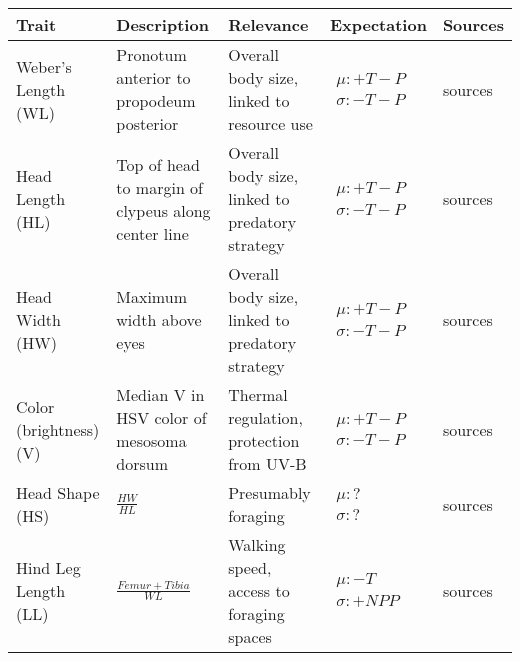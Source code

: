 \documentclass[review,preprint,3p]{elsarticle}
\begin{document}
	\begin{table}[t]
		\small
		\centering
		\begin{tabular}{m{} | >{\raggedright}m{} | m{} | >{\raggedright}m{} | m{}}
			\hline
			\centering Trait & \centering Description & \centering Relevance & Expectation & Sources \\ 
			\hline
			Weber's Length (WL) & Pronotum anterior to propodeum posterior & 
				Overall body size, linked to resource use & 
				$\begin{aligned} \mu: +T - P \\  \sigma: -T -P \end{aligned}$ & 
				{\tiny sources} \\
			\hline
			Head Length (HL) & Top of head to margin of clypeus along center line & 
				Overall body size, linked to predatory strategy &
				$\begin{aligned} \mu: +T - P \\  \sigma: -T -P \end{aligned}$ & 
				{\tiny sources} \\
			\hline
			Head Width (HW) & Maximum width above eyes & 
				Overall body size, linked to predatory strategy &
				$\begin{aligned} \mu: +T - P \\  \sigma: -T - P \end{aligned}$ & 
				{\tiny sources} \\
			\hline
			Color (brightness) (V) & Median V in HSV color of mesosoma dorsum & 
				Thermal regulation, protection from UV-B &
				$\begin{aligned} \mu: +T - P \\  \sigma: -T - P \end{aligned}$ & 
				{\tiny sources} \\
			\hline
			Head Shape (HS) & $\displaystyle \frac{HW}{HL}$ & 
				Presumably foraging &
				$\begin{aligned} \mu: ? \\  \sigma: ? \end{aligned}$ & 
				{\tiny sources} \\
			\hline
			Hind Leg Length (LL) & $\displaystyle \frac{Femur + Tibia}{WL}$ & 
				Walking speed, access to foraging spaces &
				$\begin{aligned} \mu: -T \\  \sigma: +NPP \end{aligned}$ & 
				{\tiny sources} \\

\end{tabular}
\end{table}
\end{document}

